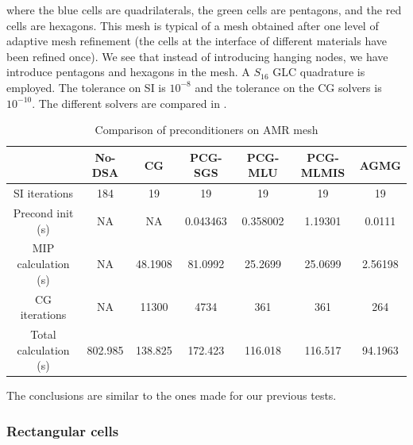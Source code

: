 where the blue cells are quadrilaterals, the green cells are pentagons, and
the red cells are hexagons. This mesh is typical of a mesh obtained after one 
level of adaptive mesh
refinement (the cells at the interface of different materials have been refined
once). We see that instead of introducing hanging nodes, we have introduce
pentagons and hexagons in the mesh.
A $S_{16}$ GLC quadrature is employed. The tolerance on SI is $10^{-8}$ and
the tolerance on the CG solvers is $10^{-10}$.
The different solvers are compared in .
\begin{table}[H]
  \caption{Comparison of preconditioners on AMR mesh}
  \begin{center}
    \begin{tabular}{|c|c|c|c|c|c|c|}
      \hline
       & No-DSA & CG & PCG-SGS & PCG-MLU & PCG-MLMIS & AGMG \\
      \hline
   SI iterations & 184     & 19      & 19       & 19      & 19       & 19 \\
Precond init (s) & NA      & NA      & 0.043463 & 0.358002 & 1.19301 & 0.0111\\
MIP calculation (s) & NA   & 48.1908 & 81.0992  & 25.2699 & 25.0699  & 
      2.56198\\
   CG iterations & NA      & 11300   & 4734     & 361     & 361      & 264 \\
     Total calculation (s) & 802.985 & 138.825 & 172.423  & 116.018 & 116.517  &
      94.1963\\
      \hline
    \end{tabular}
    \label{table_amr}
  \end{center}
\end{table}
The conclusions are similar to the ones made for our previous tests.

\subsubsection{Rectangular cells}

